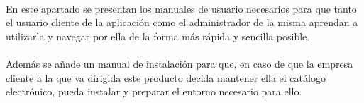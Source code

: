 
\paragraph{}En este apartado se presentan los manuales de usuario necesarios para que tanto el usuario cliente de la aplicación como el administrador de la misma aprendan a utilizarla y navegar por ella de la forma más rápida y sencilla posible.

\paragraph{}Además se añade un manual de instalación para que, en caso de que la empresa cliente a la que va dirigida este producto decida mantener ella el catálogo electrónico, pueda instalar y preparar el entorno necesario para ello.